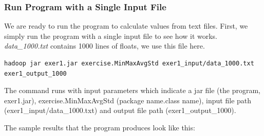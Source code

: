 \subsubsection{Run Program with a Single Input File}

We are ready to run the program to calculate values from text
files. First, we simply run the program with a single input file to
see how it works.  \textit{data_1000.txt} contains 1000 lines of
floats, we use this file here.

\begin{lstlisting}
hadoop jar exer1.jar exercise.MinMaxAvgStd exer1_input/data_1000.txt exer1_output_1000
\end{lstlisting}

The command runs with input parameters which indicate a jar file (the
program, exer1.jar), exercise.MinMaxAvgStd (package name.class name),
input file path (exer1_input/data_1000.txt) and output file path
(exer1_output_1000).

The sample results that the program produces look like this:


